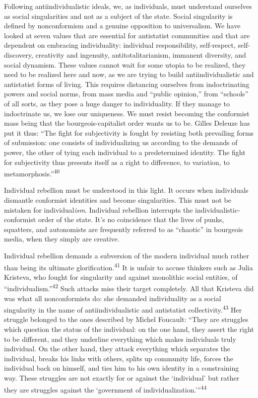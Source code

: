 Following antiindividualistic ideals, we, as individuals, must understand
ourselves as social singularities and not as a subject of the state. Social
singularity is defined by nonconformism and a genuine opposition to
universalism. We have looked at seven values that are essential for antistatist
communities and that are dependent on embracing individuality: individual
responsibility, self-respect, self-discovery, creativity and ingenuity,
antitotalitarianism, immanent diversity, and social dynamism. These values
cannot wait for some utopia to be realized, they need to be realized here and
now, as we are trying to build antiindividualistic and antistatist forms of
living. This requires distancing ourselves from indoctrinating powers and social
norms, from mass media and “public opinion,” from “schools” of all sorts, as
they pose a huge danger to individuality. If they manage to indoctrinate us, we
lose our uniqueness. We must resist becoming the conformist mass being that the
bourgeois-capitalist order wants us to be. Gilles Deleuze has put it thus: “The
fight for subjectivity is fought by resisting both prevailing forms of
submission: one consists of individualizing us according to the demands of
power, the other of tying each individual to a predetermined identity. The fight
for subjectivity thus presents itself as a right to difference, to variation, to
metamorphosis.”\textsuperscript{40}

Individual rebellion must be understood in this light. It occurs when
individuals dismantle conformist identities and become singularities. This must
not be mistaken for individual\textit{ism}. Individual rebellion interrupts the
individualistic-conformist order of the state. It’s no coincidence that the
lives of punks, squatters, and autonomists are frequently referred to as
“chaotic” in bourgeois media, when they simply are creative.

Individual rebellion demands a subversion of the modern individual much rather
than being its ultimate glorification.\textsuperscript{41} It is unfair to
accuse thinkers such as Julia Kristeva, who fought for singularity and against
monolithic social entities, of “individualism.”\textsuperscript{42} Such attacks
miss their target completely. All that Kristeva did was what all nonconformists
do: she demanded individuality as a social singularity in the name of
antiindividualistic and antistatist collectivity.\textsuperscript{43} Her
struggle belonged to the ones described by Michel Foucault: “They are struggles
which question the status of the individual: on the one hand, they assert the
right to be different, and they underline everything which makes individuals
truly individual. On the other hand, they attack everything which separates the
individual, breaks his links with others, splits up community life, forces the
individual back on himself, and ties him to his own identity in a constraining
way. These struggles are not exactly for or against the ‘individual’ but rather
they are struggles against the ‘government of
individualization.’”\textsuperscript{44}

